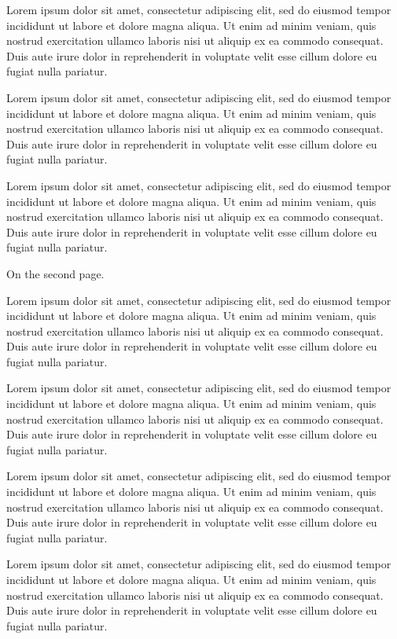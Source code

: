 \documentclass{article}
\begin{document}
Lorem ipsum dolor sit amet, consectetur adipiscing elit, sed do eiusmod tempor incididunt ut labore et dolore magna aliqua. Ut enim ad minim veniam, quis nostrud exercitation ullamco laboris nisi ut aliquip ex ea commodo consequat. Duis aute irure dolor in reprehenderit in voluptate velit esse cillum dolore eu fugiat nulla pariatur.

Lorem ipsum dolor sit amet, consectetur adipiscing elit, sed do eiusmod tempor incididunt ut labore et dolore magna aliqua. Ut enim ad minim veniam, quis nostrud exercitation ullamco laboris nisi ut aliquip ex ea commodo consequat. Duis aute irure dolor in reprehenderit in voluptate velit esse cillum dolore eu fugiat nulla pariatur.

Lorem ipsum dolor sit amet, consectetur adipiscing elit, sed do eiusmod tempor incididunt ut labore et dolore magna aliqua. Ut enim ad minim veniam, quis nostrud exercitation ullamco laboris nisi ut aliquip ex ea commodo consequat. Duis aute irure dolor in reprehenderit in voluptate velit esse cillum dolore eu fugiat nulla pariatur.

On the second page.\label{p2}

Lorem ipsum dolor sit amet, consectetur adipiscing elit, sed do eiusmod tempor incididunt ut labore et dolore magna aliqua. Ut enim ad minim veniam, quis nostrud exercitation ullamco laboris nisi ut aliquip ex ea commodo consequat. Duis aute irure dolor in reprehenderit in voluptate velit esse cillum dolore eu fugiat nulla pariatur.

Lorem ipsum dolor sit amet, consectetur adipiscing elit, sed do eiusmod tempor incididunt ut labore et dolore magna aliqua. Ut enim ad minim veniam, quis nostrud exercitation ullamco laboris nisi ut aliquip ex ea commodo consequat. Duis aute irure dolor in reprehenderit in voluptate velit esse cillum dolore eu fugiat nulla pariatur.

Lorem ipsum dolor sit amet, consectetur adipiscing elit, sed do eiusmod tempor incididunt ut labore et dolore magna aliqua. Ut enim ad minim veniam, quis nostrud exercitation ullamco laboris nisi ut aliquip ex ea commodo consequat. Duis aute irure dolor in reprehenderit in voluptate velit esse cillum dolore eu fugiat nulla pariatur.

Lorem ipsum dolor sit amet, consectetur adipiscing elit, sed do eiusmod tempor incididunt ut labore et dolore magna aliqua. Ut enim ad minim veniam, quis nostrud exercitation ullamco laboris nisi ut aliquip ex ea commodo consequat. Duis aute irure dolor in reprehenderit in voluptate velit esse cillum dolore eu fugiat nulla pariatur.
\end{document}
